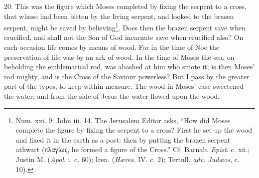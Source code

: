 20. This was the figure which Moses completed by fixing the serpent to a cross, that whoso had been bitten by the living serpent, and looked to the brasen serpent, might be saved by believing\footnote{Num. xxi. 9; John iii. 14. The Jerusalem Editor asks, “How did Moses complete the figure by fixing the serpent to a cross? First he set up the wood and fixed it in the earth as a post: then by putting the brazen serpent athwart (\textgreek{πλαγίως}, he formed a figure of the Cross.” Cf. Barnab. \emph{Epist}. c. xii.; Justin M. (\emph{Apol}. i. c. 60); Iren. (\emph{Hæres.} IV. c. 2); Tertull. \emph{adv. Judæos}, c. 10).}. Does then the brazen serpent save when crucified, and shall not the Son of God incarnate save when crucified also? On each occasion life comes by means of wood. For in the time of Noe the preservation of life was by an ark of wood. In the time of Moses the sea, on beholding the emblematical rod, was abashed at him who smote it; is then Moses’ rod mighty, and is the Cross of the Saviour powerless? But I pass by the greater part of the types, to keep within measure. The wood in Moses’ case sweetened the water; and from the side of Jesus the water flowed upon the wood.

